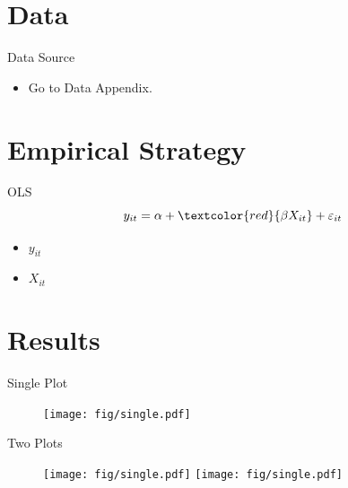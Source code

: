 \documentclass[aspectratio=169,11pt]{beamer}
\begin{document}
\section{Data}
\begin{frame}
\sectionpage
\end{frame}

\begin{frame}[label=data]{Data Source}
    \begin{itemize}
        \item Go to Data Appendix. \hyperlink{data_appendix}{}
    \end{itemize}
    
\end{frame}


\section{Empirical Strategy}
\begin{frame}
\sectionpage
\end{frame}

\begin{frame}{OLS}
    \begin{equation}
        y_{it} = \alpha + \textcolor{red}{\beta X_{it}} + \varepsilon_{it}
    \end{equation}
    \begin{itemize}
        \item $y_{it}$
        \item $X_{it}$
    \end{itemize}
\end{frame}

\section{Results}
\begin{frame}
\sectionpage
\end{frame}

\begin{frame}{Single Plot}
    \begin{figure}
        \centering
        \texttt{[image: fig/single.pdf]}
    \end{figure}
\end{frame}

\begin{frame}{Two Plots}
    \begin{figure}
        \texttt{[image: fig/single.pdf]}
        \hfill
        \texttt{[image: fig/single.pdf]}
    \end{figure}
\end{frame}
\end{document}
